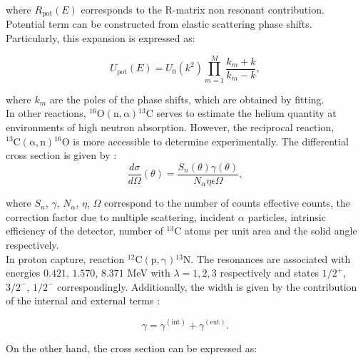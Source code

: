 \documentclass[openany]{book}
\begin{document}
where $R_{\mathrm{pot}}(E)$ corresponds to the R-matrix non resonant contribution. Potential term can be constructed from elastic scattering phase shifts. Particularly, this expansion is expressed as:

\begin{equation}\label{eq:rmatrix_potentialResonant_potential}
	U_\mathrm{pot}(E) = U_0(k^2) \prod_{m=1}^{M} \frac{k_m + k}{k_m - k},
\end{equation}

where $k_m$ are the poles of the phase shifts, which are obtained by fitting.\\ 

In other reactions, $\mathrm{{}^{16}O(n, \alpha){}^{13}C }$ serves to estimate the helium quantity at environments of high neutron absorption. However, the reciprocal reaction,  $\mathrm{{}^{13}C(\alpha, n){}^{16}O }$ is more accessible to determine experimentally. The differential cross section is given by \cite{prusachenko_bobrovsky_bondarenko_bokhovko_gurbich_ketlerov_2022}: \\


\begin{equation}\label{eq:rmatrix_differentialCrossSection_experimental}
	\frac{d\sigma}{d\Omega}(\theta) = \frac{S_n(\theta)\gamma(\theta)}{N_\alpha \eta \epsilon \Omega},
\end{equation}

where $S_n$, $\gamma$, $N_\alpha$, $\eta$, $\Omega$ correspond to the number of counts effective counts, the correction factor due to multiple scattering, incident $\alpha$ particles, intrinsic efficiency of the detector, number of $\mathrm{{}^{13}C}$ atoms per unit area and the solid angle respectively. \\

In proton capture, reaction $\mathrm{{}^{12}C(p, \gamma){}^{13}N }$. The resonances are associated with energies $0.421$, $1.570$, $8.371$ MeV with $\lambda = 1, 2, 3$ respectively and states $1/2^{+}$, $3/2^{-}$, $1/2^{-}$ correspondingly. Additionally,  the width is given by the contribution of the internal and external terms \cite{burtebaev_igamov_peterson_yarmukhamedov_zazulin_2008}:



\begin{equation}\label{eq:rmatrix_width_internalExternal}
	\gamma = \gamma^{(\mathrm{int})} + \gamma^{(\mathrm{ext})}.
\end{equation}

On the other hand, the cross section can be expressed as: 
\end{document}
